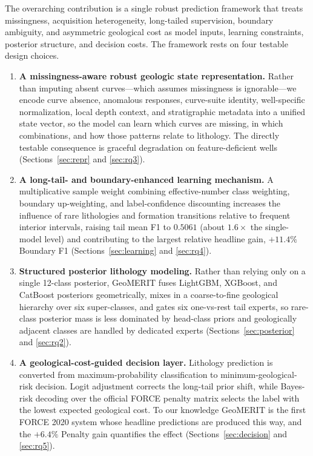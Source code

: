 \documentclass[bdcc,article,submit,pdftex,moreauthors]{Definitions/mdpi}
\begin{document}
The overarching contribution is a single robust prediction framework that treats missingness,
acquisition heterogeneity, long-tailed supervision, boundary ambiguity, and asymmetric
geological cost as model inputs, learning constraints, posterior structure, and decision costs.
The framework rests on four testable design choices.
\begin{enumerate}
\item \textbf{A missingness-aware robust geologic state representation.} Rather than imputing
absent curves---which assumes missingness is ignorable---we encode curve absence, anomalous
responses, curve-suite identity, well-specific normalization, local depth context, and
stratigraphic metadata into a unified state vector, so the model can learn which curves are
missing, in which combinations, and how those patterns relate to lithology. The directly
testable consequence is graceful degradation on feature-deficient wells
(Sections~\ref{sec:repr} and \ref{sec:rq3}).
\item \textbf{A long-tail- and boundary-enhanced learning mechanism.} A multiplicative sample
weight combining effective-number class weighting, boundary up-weighting, and label-confidence
discounting increases the influence of rare lithologies and formation transitions relative to
frequent interior intervals, raising tail mean F1 to $0.5061$ (about $1.6\times$ the
single-model level) and contributing to the largest relative headline gain, $+11.4\%$
Boundary F1 (Sections~\ref{sec:learning} and \ref{sec:rq4}).
\item \textbf{Structured posterior lithology modeling.} Rather than relying only on a single
12-class posterior, GeoMERIT fuses LightGBM, XGBoost, and CatBoost posteriors geometrically,
mixes in a coarse-to-fine geological hierarchy over six super-classes, and gates six
one-vs-rest tail experts, so rare-class posterior mass is less dominated by head-class priors
and geologically adjacent classes are handled by dedicated experts (Sections~\ref{sec:posterior}
and \ref{sec:rq2}).
\item \textbf{A geological-cost-guided decision layer.} Lithology prediction is converted from
maximum-probability classification to minimum-geological-risk decision. Logit adjustment
corrects the long-tail prior shift, while Bayes-risk decoding over the official FORCE penalty
matrix selects the label with the lowest expected geological cost. To our knowledge GeoMERIT
is the first FORCE 2020 system whose headline predictions are produced this way, and the
$+6.4\%$ Penalty gain quantifies the effect (Sections~\ref{sec:decision} and \ref{sec:rq5}).
\end{enumerate}
\end{document}
